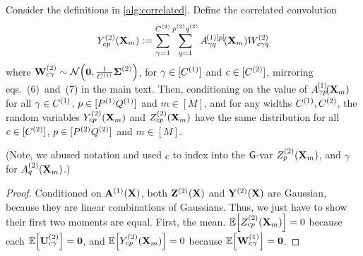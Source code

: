 {{\begin{algorithm}
\begin{algorithmic}
  \EndFor

  \vspace{1ex}
  \EndFor
\end{algorithmic}
\end{algorithm}

\begin{lemma}
  Consider the definitions in \cref{alg:correlated}. Define the correlated convolution
  \[Y_{cp}^{(2)}(\vX_m) \eqdef \sum_{\gamma=1}^{\layerC{2}}
    \sum_{q=1}^{\patchsize{2}} \layerNLAsmp{(1)[p]}{\gamma q}{\vX_m} W^{(2)}_{c\gamma q}\]
  where $\vW^{(2)}_{c\gamma} \sim \NormDist{{\boldsymbol 0},
    \frac{1}{\layerC{1}}\priorWcov{2}}$, for $\gamma \in [C^{(1)}]$ and $c \in [C^{(2)}]$, mirroring eqs.~(6)~and~(7) in the main text.
  Then, conditioning on the value of
  $\layerNLAsm{1}{\gamma\patch}{\vX_m}$ for all $\gamma \in C^{(1)}$, $p \in [P^{(1)}Q^{(1)}]$ and $m
  \in [M]$, and for any widths $C^{(1)}, C^{(2)}$, the random variables $Y_{cp}^{(2)}(\mathbf{X}_m)$ and $Z_{cp}^{(2)}(\mathbf{X}_m)$
  have the same distribution for all $c \in [C^{(2)}]$, $p \in
  [P^{(2)}Q^{(2)}]$ and $m \in [M]$. 
  \label{lemma:correlated-weights-nn}
\end{lemma}
(Note, we abused notation and used $c$ to index into the $\mathsf{G}$-var
$Z_p^{(2)}(\mathbf{X}_m)$, and $\gamma$ for $A_q^{(2)}(\mathbf{X}_m)$.)
\begin{proof}
  Conditioned on $\mathbf{A}^{(1)}(\mathbf{X})$, both $\mathbf{Z}^{(2)}(\mathbf{X})$ and $\mathbf{Y}^{(2)}(\mathbf{X})$
  are Gaussian, because they are linear combinations of Gaussians. Thus, we just
  have to show their first two moments are equal. First, the mean.
  $\ExpSymb\sqb{Z_{cp}^{(2)}(\vX_m)} = 0$ because each
  $\ExpSymb\sqb{\layerU{2}_{c\gamma}} = {\boldsymbol 0}$, and
  $\ExpSymb\sqb{Y_{cp}^{(2)}(\vX_m)} = 0$ because $\ExpSymb\sqb{\layerW{1}_{c\gamma}} = {\boldsymbol 0}$.


\end{proof}}}
